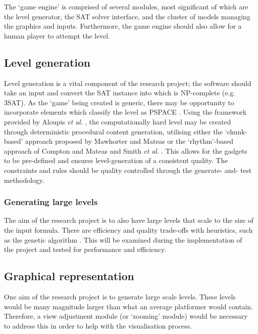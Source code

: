 \documentclass[11pt, a4paper, oneside]{report} %
\begin{document}
The `game engine' is comprised of several modules, most significant of which are the level
generator, the SAT solver interface, and the cluster of models managing the graphics and inputs.
Furthermore, the game engine should also allow for a human player to attempt the level.

\subsection{Level generation}

Level generation is a vital component of the research project; the software should take an input and
convert the SAT instance into which is NP-complete (e.g. 3SAT). As the `game' being created is
generic, there may be opportunity to incorporate elements which classify the level as PSPACE . Using
the framework provided by Aloupis \textit{et al}. \cite{Aloupis2012}, the computationally hard level may be
created through deterministic procedural content generation, utilising either the `chunk-based'
approach proposed by Mawhorter and Mateas \cite{mawhorter2010procedural} or the `rhythm'-based
approach of Compton and Mateas \cite{compton2006procedural} and Smith \textit{et al}.
\cite{Smith:2009:RLG:1536513.1536548}. This allows for the gadgets to be pre-defined and ensures
level-generation of a consistent quality. The constraints and rules should be quality controlled
through the generate- and- test methodology.

\subsubsection{Generating large levels}

The aim of the research project is to also have large levels that scale to the size of the input
formula. There are efficiency and quality trade-offs with heuristics, such as the genetic algorithm
\cite{mourato2011automatic}. This will be examined during the implementation of the project and
tested for performance and efficiency.

\subsection{Graphical representation}

One aim of the research project is to generate large scale levels. These levels would be many
magnitude larger than what an average platformer would contain. Therefore, a view adjustment module
(or `zooming' module) would be necessary to address this in order to help with the visualisation
process.
\end{document}
